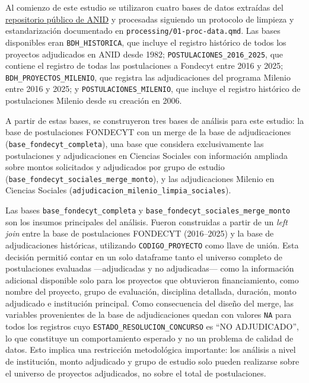\documentclass[
  spanish,
  a4paper,
  oneside]{scrbook}
\begin{document}
Al comienzo de este estudio se utilizaron cuatro bases de datos
extraídas del \href{https://github.com/ANID-GITHUB}{repositorio público
de ANID} y procesadas siguiendo un protocolo de limpieza y
estandarización documentado en \texttt{processing/01-proc-data.qmd}. Las
bases disponibles eran \texttt{BDH\_HISTORICA}, que incluye el registro
histórico de todos los proyectos adjudicados en ANID desde 1982;
\texttt{POSTULACIONES\_2016\_2025}, que contiene el registro de todas
las postulaciones a Fondecyt entre 2016 y 2025;
\texttt{BDH\_PROYECTOS\_MILENIO}, que registra las adjudicaciones del
programa Milenio entre 2016 y 2025; y \texttt{POSTULACIONES\_MILENIO},
que incluye el registro histórico de postulaciones Milenio desde su
creación en 2006.

A partir de estas bases, se construyeron tres bases de análisis para
este estudio: la base de postulaciones FONDECYT con un merge de la base
de adjudicaciones (\texttt{base\_fondecyt\_completa}), una base que
considera exclusivamente las postulaciones y adjudicaciones en Ciencias
Sociales con información ampliada sobre montos solicitados y adjudicados
por grupo de estudio (\texttt{base\_fondecyt\_sociales\_merge\_monto}),
y las adjudicaciones Milenio en Ciencias Sociales
(\texttt{adjudicacion\_milenio\_limpia\_sociales}).

Las bases \texttt{base\_fondecyt\_completa} y
\texttt{base\_fondecyt\_sociales\_merge\_monto} son los insumos
principales del análisis. Fueron construidas a partir de un \emph{left
join} entre la base de postulaciones FONDECYT (2016--2025) y la base de
adjudicaciones históricas, utilizando \texttt{CODIGO\_PROYECTO} como
llave de unión. Esta decisión permitió contar en un solo dataframe tanto
el universo completo de postulaciones evaluadas ---adjudicadas y no
adjudicadas--- como la información adicional disponible solo para los
proyectos que obtuvieron financiamiento, como nombre del proyecto, grupo
de evaluación, disciplina detallada, duración, monto adjudicado e
institución principal. Como consecuencia del diseño del merge, las
variables provenientes de la base de adjudicaciones quedan con valores
\texttt{NA} para todos los registros cuyo
\texttt{ESTADO\_RESOLUCION\_CONCURSO} es ``NO ADJUDICADO'', lo que
constituye un comportamiento esperado y no un problema de calidad de
datos. Esto implica una restricción metodológica importante: los
análisis a nivel de institución, monto adjudicado y grupo de estudio
solo pueden realizarse sobre el universo de proyectos adjudicados, no
sobre el total de postulaciones.
\end{document}
